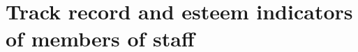 \documentclass[11pt]{article}
\begin{document}
    \maketitle
    \setcounter{section}{3}
    \section{Track record and esteem indicators of members of staff}

    
    
    
    
    
    
    
%    
\end{document}
